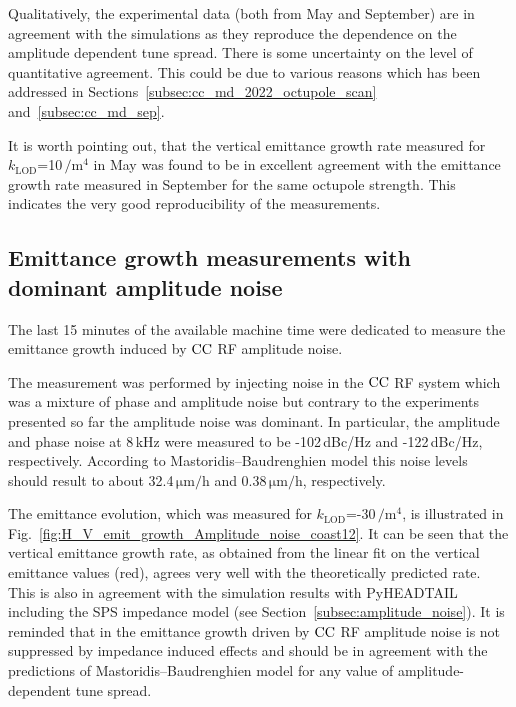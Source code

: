 Qualitatively, the experimental data (both from May and September) are in agreement with the simulations as they reproduce the dependence on the amplitude dependent tune spread. There is some uncertainty on the level of quantitative agreement. This could be due to various reasons which has been addressed in Sections~\ref{subsec:cc_md_2022_octupole_scan} and~\ref{subsec:cc_md_sep}.

It is worth pointing out, that the vertical emittance growth rate measured for $k_\mathrm{LOD}$=10\,$\mathrm{/m^4}$ in May was found to be in excellent agreement with the emittance growth rate measured in September for the same octupole strength. This indicates the very good reproducibility of the measurements.

\subsection{Emittance growth measurements with dominant amplitude noise}
The last 15 minutes of the available machine time were dedicated to measure the emittance growth induced by ${\mathrm{CC}}$ RF amplitude noise. 

The measurement was performed by injecting noise in the ${\mathrm{CC}}$ RF system which was a mixture of phase and amplitude noise but contrary to the experiments presented so far the amplitude noise was dominant. In particular, the amplitude and phase noise at 8\,kHz were measured to be -102\,dBc/Hz and -122\,dBc/Hz, respectively. According to Mastoridis--Baudrenghien model this noise levels should result to about 32.4\,$\mathrm{\mu m/h}$ and 0.38\,$\mathrm{\mu m/h}$, respectively. %


The emittance evolution, which was measured for $k_\mathrm{LOD}$=-30\,$\mathrm{/m^4}$, is illustrated in Fig.~\ref{fig:H_V_emit_growth_Amplitude_noise_coast12}. It can be seen that the vertical emittance growth rate, as obtained from the linear fit on the vertical emittance values (red), agrees very well with the theoretically predicted rate. This is also in agreement with the simulation results with PyHEADTAIL including the SPS impedance model (see Section~\ref{subsec:amplitude_noise}). It is reminded that in the emittance growth driven by ${\mathrm{CC}}$ RF amplitude noise is not suppressed by impedance induced effects and should be in agreement with the predictions of Mastoridis--Baudrenghien model for any value of amplitude-dependent tune spread.


